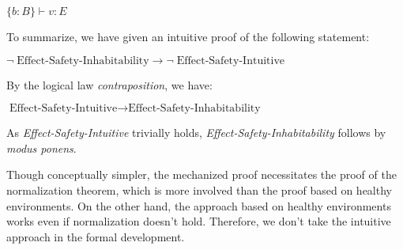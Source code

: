 \begin{center}
$\{b:B\} \vdash v: E$
\end{center}

To summarize, we have given an intuitive proof of the following
statement:

\begin{center}
  $\neg \; \text{Effect-Safety-Inhabitability} \to \neg \;
  \text{Effect-Safety-Intuitive}$
\end{center}

By the logical law \emph{contraposition}, we have:

\begin{center}
  $ \text{Effect-Safety-Intuitive} \to
  \text{Effect-Safety-Inhabitability} $
\end{center}

As \emph{Effect-Safety-Intuitive} trivially holds,
\emph{Effect-Safety-Inhabitability} follows by \emph{modus ponens}.

Though conceptually simpler, the mechanized proof necessitates the
proof of the normalization theorem, which is more involved than the
proof based on healthy environments. On the other hand, the approach
based on healthy environments works even if normalization doesn't
hold. Therefore, we don't take the intuitive approach in the formal
development.

